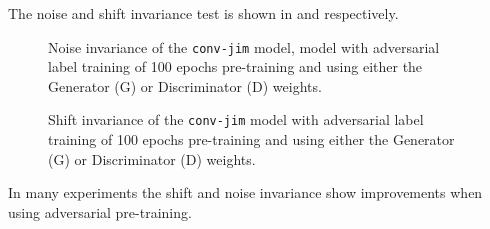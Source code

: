 The noise and shift invariance test is shown in  and  respectively.
\begin{figure}[!ht]
  \centering
  \caption{Noise invariance of the \texttt{conv-jim} model,  model with adversarial label training of 100 epochs pre-training and using either the Generator (G) or Discriminator (D) weights.}
  \label{fig:exp_adv_label_tb_noise_conv-jim}
\end{figure}
\FloatBarrier
\noindent
\begin{figure}[!ht]
  \centering
  \caption{Shift invariance of the \texttt{conv-jim} model with adversarial label training of 100 epochs pre-training and using either the Generator (G) or Discriminator (D) weights.}
  \label{fig:exp_adv_label_tb_shift_conv-jim}
\end{figure}
\FloatBarrier
\noindent
In many experiments the shift and noise invariance show improvements when using adversarial pre-training. 




